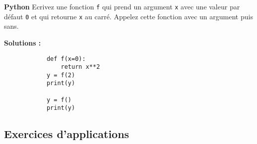 \begin{Exercice}[5 minutes] \textbf{Python}
    Ecrivez une fonction \lstinline{f} qui prend un argument \lstinline{x} avec une valeur par défaut \lstinline{0} et qui retourne \lstinline{x} au carré. Appelez cette fonction avec un argument puis sans.
    \begin{conseil}
        
    \end{conseil}
    \textbf{Solutions :}

        \begin{verbatim}
            def f(x=0):
                return x**2
            y = f(2)
            print(y)
            
            y = f()
            print(y)
        \end{verbatim}

\end{Exercice}

\subsection{Exercices d'applications}

